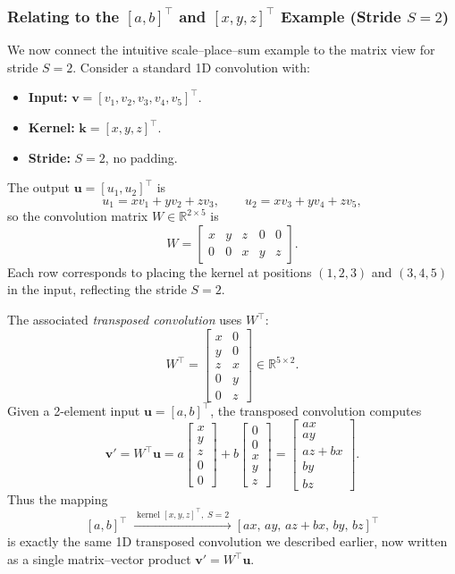 \subsubsection{Relating to the \([a, b]^\top\) and \([x, y, z]^\top\) Example (Stride \(S=2\))}

\noindent
We now connect the intuitive scale--place--sum example to the matrix view for stride \(S=2\). Consider a standard 1D convolution with:

\begin{itemize}
	\item \textbf{Input:} \(\mathbf{v} = [v_1, v_2, v_3, v_4, v_5]^\top\).
	\item \textbf{Kernel:} \(\mathbf{k} = [x, y, z]^\top\).
	\item \textbf{Stride:} \(S = 2\), no padding.
\end{itemize}

\noindent
The output \(\mathbf{u} = [u_1, u_2]^\top\) is
\[
u_1 = x v_1 + y v_2 + z v_3, \qquad
u_2 = x v_3 + y v_4 + z v_5,
\]
so the convolution matrix \(W \in \mathbb{R}^{2 \times 5}\) is
\[
W =
\begin{bmatrix}
	x & y & z & 0 & 0 \\
	0 & 0 & x & y & z
\end{bmatrix}.
\]
Each row corresponds to placing the kernel at positions \((1,2,3)\) and \((3,4,5)\) in the input, reflecting the stride \(S=2\).

\medskip

\noindent
The associated \emph{transposed convolution} uses \(W^\top\):
\[
W^\top =
\begin{bmatrix}
	x & 0 \\
	y & 0 \\
	z & x \\
	0 & y \\
	0 & z
\end{bmatrix}
\in \mathbb{R}^{5 \times 2}.
\]
Given a 2-element input \(\mathbf{u} = [a, b]^\top\), the transposed convolution computes
\[
\mathbf{v}' = W^\top \mathbf{u}
=
a
\begin{bmatrix}
	x \\ y \\ z \\ 0 \\ 0
\end{bmatrix}
+
b
\begin{bmatrix}
	0 \\ 0 \\ x \\ y \\ z
\end{bmatrix}
=
\begin{bmatrix}
	ax \\ ay \\ az + bx \\ by \\ bz
\end{bmatrix}.
\]
Thus the mapping
\[
[a, b]^\top
\;\xrightarrow{\;\text{kernel }[x,y,z]^\top,\; S=2\;}
[ax,\, ay,\, az+bx,\, by,\, bz]^\top
\]
is exactly the same 1D transposed convolution we described earlier, now written as a single matrix--vector product \(\mathbf{v}' = W^\top \mathbf{u}\).

